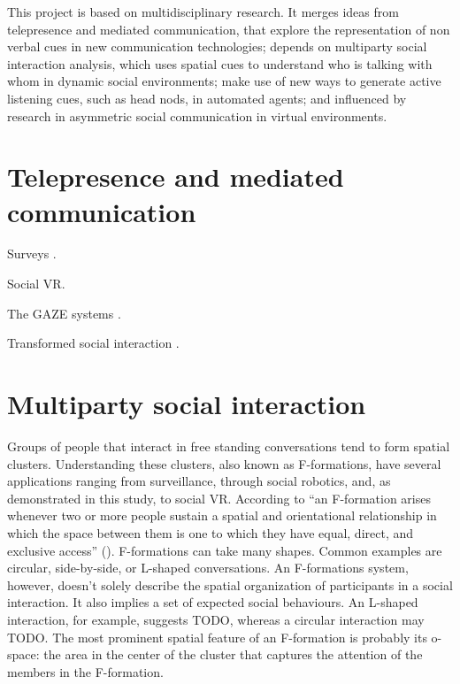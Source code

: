 \documentclass[]{simple-thesis}
\begin{document}
This project is based on multidisciplinary research.
It merges ideas from telepresence and mediated communication, that explore the representation of non verbal cues in new communication technologies;
depends on multiparty social interaction analysis, which uses spatial cues to understand who is talking with whom in dynamic social environments;
make use of new ways to generate active listening cues, such as head nods, in automated agents;
and influenced by research in asymmetric social communication in virtual environments.

\section{Telepresence and mediated communication}

Surveys \citep{Isaacs1994, Erickson2000}.

Social VR.

The GAZE systems \citep{Vertegaal1999, Vertegaal2003}.

Transformed social interaction \citep{Bailenson2004, Bailenson2008}.

\section{Multiparty social interaction}


Groups of people that interact in free standing conversations tend to form spatial clusters.
Understanding these clusters, also known as F-formations, have several applications ranging from surveillance, through social robotics, and, as demonstrated in this study, to social VR.
According to \citeauthor{Kendon1990} ``an F-formation arises whenever two or more people sustain a spatial and orientational relationship in which the space between them is one to which they have equal, direct, and exclusive access'' (\citeyear[p. 209]{Kendon1990}).
F-formations can take many shapes.
Common examples are circular, side-by-side, or L-shaped conversations.
An F-formations system, however, doesn't solely describe the spatial organization of participants in a social interaction.
It also implies a set of expected social behaviours.
An L-shaped interaction, for example, suggests TODO, whereas a circular interaction may TODO.
The most prominent spatial feature of an F-formation is probably its o-space: the area in the center of the cluster that captures the attention of the members in the F-formation.
\end{document}
